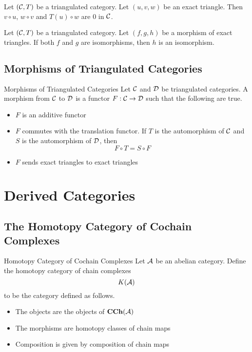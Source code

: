 \documentclass[a4paper]{article}
\begin{document}
\begin{lmm}{}{} Let $(\mathcal{C},T)$ be a triangulated category. Let $(u,v,w)$ be an exact triangle. Then $v\circ u$, $w\circ v$ and $T(u)\circ w$ are $0$ in $\mathcal{C}$. 
\end{lmm}

\begin{lmm}{}{} Let $(\mathcal{C},T)$ be a triangulated category. Let $(f,g,h)$ be a morphism of exact triangles. If both $f$ and $g$ are isomorphisms, then $h$ is an isomorphism. 
\end{lmm}

\subsection{Morphisms of Triangulated Categories}
\begin{defn}{Morphisms of Triangulated Categories}{} Let $\mathcal{C}$ and $\mathcal{D}$ be triangulated categories. A morphism from $\mathcal{C}$ to $\mathcal{D}$ is a functor $F:\mathcal{C}\to\mathcal{D}$ such that the following are true. 
\begin{itemize}
\item $F$ is an additive functor
\item $F$ commutes with the translation functor. If $T$ is the automorphism of $\mathcal{C}$ and $S$ is the automorphism of $\mathcal{D}$, then $$F\circ T=S\circ F$$
\item $F$ sends exact triangles to exact triangles
\end{itemize}
\end{defn}

\pagebreak
\section{Derived Categories}
\subsection{The Homotopy Category of Cochain Complexes}
\begin{defn}{Homotopy Category of Cochain Complexes}{} Let $\mathcal{A}$ be an abelian category. Define the homotopy category of chain complexes $$K(\mathcal{A})$$ to be the category defined as follows. 
\begin{itemize}
\item The objects are the objects of $\bold{CCh}(\mathcal{A})$
\item The morphisms are homotopy classes of chain maps
\item Composition is given by composition of chain maps
\end{itemize}
\end{defn}
\end{document}

